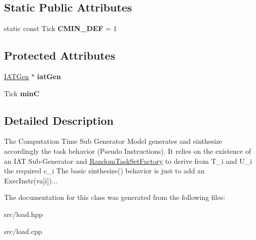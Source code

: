 \subsection*{Static Public Attributes}
\begin{DoxyCompactItemize}
\item 
static const Tick {\bfseries C\+M\+I\+N\+\_\+\+D\+EF} = 1\hypertarget{classRTSim_1_1CTGen_a951a2c2a4bea0745a375c2724ef64497}{}\label{classRTSim_1_1CTGen_a951a2c2a4bea0745a375c2724ef64497}

\end{DoxyCompactItemize}
\subsection*{Protected Attributes}
\begin{DoxyCompactItemize}
\item 
\hyperlink{classRTSim_1_1IATGen}{I\+A\+T\+Gen} $\ast$ {\bfseries iat\+Gen}\hypertarget{classRTSim_1_1CTGen_a34d7b4a08fa9394e1a3e3836effa5c2e}{}\label{classRTSim_1_1CTGen_a34d7b4a08fa9394e1a3e3836effa5c2e}

\item 
Tick {\bfseries minC}\hypertarget{classRTSim_1_1CTGen_a5f1b6af4145601f064f1b4c9bdbe0522}{}\label{classRTSim_1_1CTGen_a5f1b6af4145601f064f1b4c9bdbe0522}

\end{DoxyCompactItemize}


\subsection{Detailed Description}
The Computation Time Sub Generator Model generates and sinthesize accordingly the task behavior (Pseudo Instructions). It relies on the existence of an I\+AT Sub-\/\+Generator and \hyperlink{classRTSim_1_1RandomTaskSetFactory}{Random\+Task\+Set\+Factory} to derive from T\+\_\+i and U\+\_\+i the required c\+\_\+i The basic sinthesize() behavior is just to add an Exec\+Instr(va\mbox{[}i\mbox{]})... 

The documentation for this class was generated from the following files\+:\begin{DoxyCompactItemize}
\item 
src/load.\+hpp\item 
src/load.\+cpp\end{DoxyCompactItemize}
